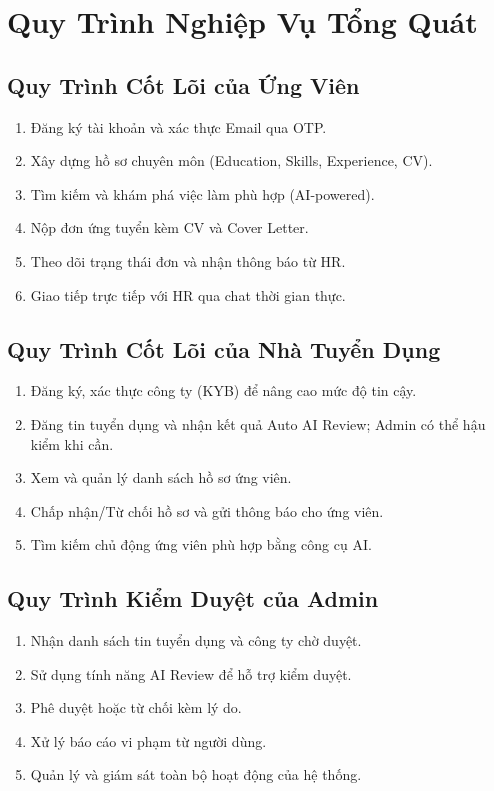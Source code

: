 \documentclass[12pt, a4paper]{report}
\begin{document}
\section{Quy Trình Nghiệp Vụ Tổng Quát}

\subsection{Quy Trình Cốt Lõi của Ứng Viên}
\begin{enumerate}
    \item Đăng ký tài khoản và xác thực Email qua OTP.
    \item Xây dựng hồ sơ chuyên môn (Education, Skills, Experience, CV).
    \item Tìm kiếm và khám phá việc làm phù hợp (AI-powered).
    \item Nộp đơn ứng tuyển kèm CV và Cover Letter.
    \item Theo dõi trạng thái đơn và nhận thông báo từ HR.
    \item Giao tiếp trực tiếp với HR qua chat thời gian thực.
\end{enumerate}

\subsection{Quy Trình Cốt Lõi của Nhà Tuyển Dụng}
\begin{enumerate}
    \item Đăng ký, xác thực công ty (KYB) để nâng cao mức độ tin cậy.
    \item Đăng tin tuyển dụng và nhận kết quả Auto AI Review; Admin có thể hậu kiểm khi cần.
    \item Xem và quản lý danh sách hồ sơ ứng viên.
    \item Chấp nhận/Từ chối hồ sơ và gửi thông báo cho ứng viên.
    \item Tìm kiếm chủ động ứng viên phù hợp bằng công cụ AI.
\end{enumerate}

\subsection{Quy Trình Kiểm Duyệt của Admin}
\begin{enumerate}
    \item Nhận danh sách tin tuyển dụng và công ty chờ duyệt.
    \item Sử dụng tính năng AI Review để hỗ trợ kiểm duyệt.
    \item Phê duyệt hoặc từ chối kèm lý do.
    \item Xử lý báo cáo vi phạm từ người dùng.
    \item Quản lý và giám sát toàn bộ hoạt động của hệ thống.
\end{enumerate}
\end{document}
